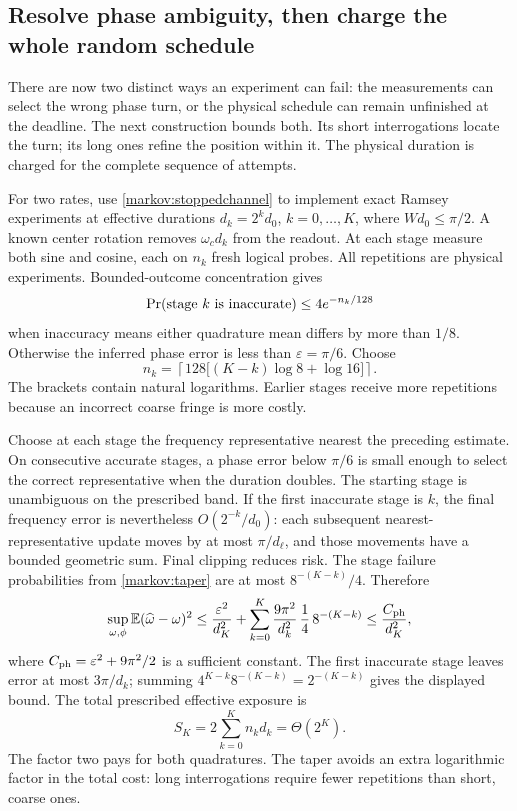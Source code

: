 \documentclass[11pt,a4paper]{article}
\numberwithin{equation}{section}
\theoremstyle{remark}
\begin{document}
\subsection{Resolve phase ambiguity, then charge the whole random schedule}

There are now two distinct ways an experiment can fail: the measurements
can select the wrong phase turn, or the physical schedule can remain
unfinished at the deadline. The next construction bounds both. Its short
interrogations locate the turn; its long ones refine the position within it.
The physical duration is charged for the complete sequence of attempts.

For two rates, use \eqref{markov:stoppedchannel} to implement exact Ramsey
experiments at effective durations $d_k=2^kd_0$, $k=0,\ldots,K$, where
$Wd_0\le\pi/2$. A known center rotation removes $\omega_c d_k$ from the
readout. At each stage measure both sine and cosine, each on $n_k$ fresh
logical probes. All repetitions are physical experiments. Bounded-outcome
concentration gives
\begin{equation}
 \Pr(\hbox{stage $k$ is inaccurate})\le4e^{-n_k/128}
\end{equation}
when inaccuracy means either quadrature mean differs by more than $1/8$.
Otherwise the inferred phase error is less than $\varepsilon=\pi/6$. Choose
\begin{equation}
 n_k=\left\lceil128\bigl[(K-k)\log8+\log16\bigr]\right\rceil.
 \label{markov:taper}
\end{equation}
The brackets contain natural logarithms. Earlier stages receive more
repetitions because an incorrect coarse fringe is more costly.

Choose at each stage the frequency representative nearest the preceding
estimate. On consecutive accurate stages, a phase error below $\pi/6$ is
small enough to select the correct representative when the duration doubles.
The starting stage is unambiguous on the prescribed band. If the first
inaccurate stage is $k$, the final frequency error is nevertheless
$O(2^{-k}/d_0)$: each subsequent nearest-representative update moves by at
most $\pi/d_\ell$, and those movements have a bounded geometric sum.
Final clipping reduces risk. The stage failure probabilities from
\eqref{markov:taper} are at most $8^{-(K-k)}/4$. Therefore
\begin{equation}
 \sup_{\omega,\phi}\mathbb E(\widehat\omega-\omega)^2
 \le\frac{\varepsilon^2}{d_K^2}
 +\sum_{k=0}^K\frac{9\pi^2}{d_k^2}\,\frac14\,8^{-(K-k)}
 \le\frac{C_{\rm ph}}{d_K^2},
 \label{markov:riskseries}
\end{equation}
where $C_{\rm ph}=\varepsilon^2+9\pi^2/2$ is a sufficient constant.
The first inaccurate stage leaves error at most $3\pi/d_k$; summing
$4^{K-k}8^{-(K-k)}=2^{-(K-k)}$ gives the displayed bound. The total
prescribed effective exposure is
\begin{equation}
 S_K=2\sum_{k=0}^K n_k d_k=\Theta(2^K).
 \label{markov:effectivecost}
\end{equation}
The factor two pays for both quadratures. The taper avoids an extra
logarithmic factor in the total cost: long interrogations require fewer
repetitions than short, coarse ones.
\end{document}
